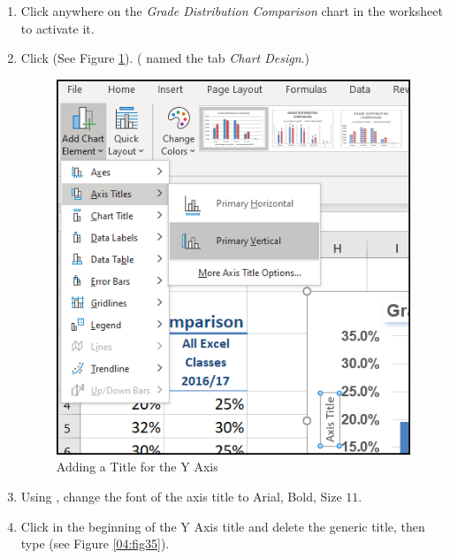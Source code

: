 \begin{enumbox}
	\begin{enumerate}
		\item Click anywhere on the \textit{Grade Distribution Comparison} chart in the  worksheet to activate it.
		\item Click  (See Figure \ref{04:fig34}). ( named the tab \textit{Chart Design}.)
	
		\begin{figure}[H]
			\centering
			\includegraphics[width=\maxwidth{.95\linewidth}]{gfx/ch04_fig34}
			\caption{Adding a Title for the Y Axis}
			\label{04:fig34}
		\end{figure}
	
		\item Using , change the font of the axis title to Arial, Bold, Size $ 11 $.
		\item Click in the beginning of the Y Axis title and delete the generic title, then type  (see Figure \ref{04:fig35}).
	\end{enumerate}
\end{enumbox}
	
